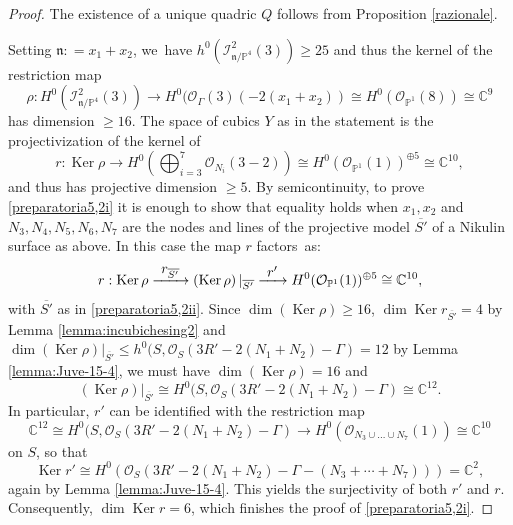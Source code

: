 \documentclass[JEP,XML,SOM,Unicode,NoEqCountersInSection,published]{cedram}
\newcommand{\To}[1]{\mathchoice{\xrightarrow{\textstyle\kern4pt#1\kern3pt}}{\stackrel{#1}{\longrightarrow}}{}{}}
\theoremstyle{plain}
\theoremstyle{definition}
\DeclareMathOperator{\Ker}{Ker}
\newcommand\CC{{\mathbb C}}
\newcommand\PP{{\mathbb P}}
\renewcommand\O{{\mathcal O}}
\let\+\oplus
\begin{document}
\begin{proof}
The existence of a unique quadric $Q$ follows from Proposition \ref{razionale}.

Setting $\mathfrak{n}: = x_1 + x_2 $, we~have $h^0(\mathcal I^2_{\mathfrak{n}/\PP^4}(3))\geq 25$ and thus the kernel of the
restriction map
\begin{equation} \label{eq:rho4,4}
\rho: H^0(\mathcal I^2_{\mathfrak{n}/\PP^4}(3)) \to
H^0(\mathcal \O_{\Gamma}(3)(-2(x_1+x_2))\cong H^0(\O_{\PP^1}(8)) \cong \CC^9
\end{equation}
has dimension $\geq16$. The space of cubics $Y$ as in the statement is the projectivization of the kernel of
\begin{equation} \label{eq:restr2}
r: \Ker \rho \to H^0(\textstyle\bigoplus_{i=3}^7 \O_{N_i}(3-2))
\cong H^0(\O_{\PP^1}(1))^{\+ 5} \cong \CC^{10},
\end{equation}
and thus has projective dimension $\geq 5$. By semicontinuity, to prove \eqref{preparatoria5,2i} it is enough to show that equality holds when $x_1,x_2$ and $N_3,N_4,N_5,N_6,N_7$ are the nodes and lines of the projective model $\overline{S'}$ of a Nikulin surface as above. In this case the map $r$ factors~as:
\begin{equation}\label{fact} r: \Ker \rho \To{r_{\overline{S'}}}
\left(\Ker \rho\right)|_{\overline{S'}} \To{r'} H^0(\O_{\PP^1}(1))^{\+ 5} \cong \CC^{10},\end{equation}
with $\overline{S'}$ as in \eqref{preparatoria5,2ii}.
Since $\dim (\Ker \rho) \geq 16$, $\dim \Ker r_{\overline{S'}}=4$ by Lemma \ref{lemma:incubichesing2} and $\dim \left(\Ker \rho\right)|_{\overline{S'}} \leq h^0(S,\O_S(3R'-2(N_1+N_2)-\Gamma)=12$ by Lemma \ref{lemma:Juve-15-4},
we must have
$\dim (\Ker \rho) =16$ and
\[
 \left(\Ker \rho\right)|_{\overline{S'}} \cong H^0(S,\O_S(3R'-2(N_1+N_2)-\Gamma) \cong \CC^{12}.
\]
In particular, $r'$ can be identified with the restriction map
\[
 \CC^{12} \cong H^0(S,\O_S(3R'-2(N_1+N_2)-\Gamma) \to H^0(\O_{N_3 \cup \dots \cup N_7}(1)) \cong \CC^{10}
\]
on $S$, so that
\[
 \Ker r' \cong H^0(\O_S(3R'-2(N_1+N_2)-\Gamma-(N_3+\cdots+N_7)))=\CC^2,
\]
again by Lemma \ref{lemma:Juve-15-4}. This yields the surjectivity of both $r'$ and $r$. Consequently, $\dim \Ker r =6$, which finishes the proof of \eqref{preparatoria5,2i}.


\end{proof}
\end{document}

